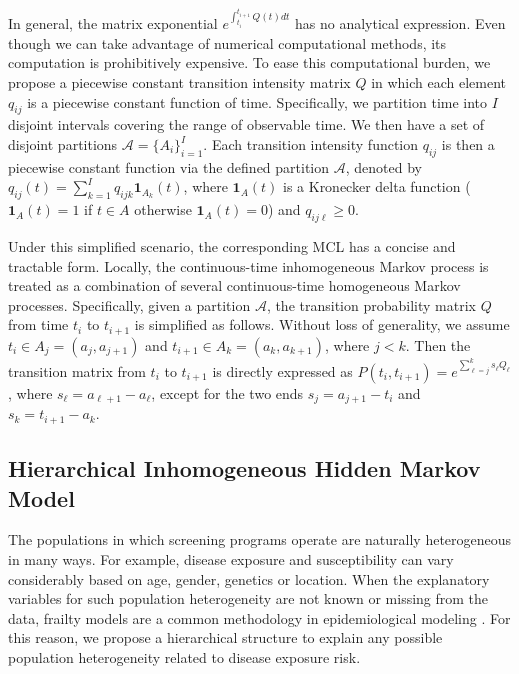 \documentclass{article}
\begin{document}
In general, the matrix exponential $e^{\int _{t_i}^{t_{i+1}}Q(t)dt}$ has no analytical expression. Even though we can take advantage of numerical computational methods, its computation is prohibitively expensive. To ease this computational burden, we propose a piecewise constant transition intensity matrix $Q$ in which each element $q_{ij}$ is a piecewise constant function of time. Specifically, we  partition time into $I$ disjoint intervals covering the range of observable time.  We then have a set of disjoint partitions $\mathcal{A} = \{ A_i\}_{i=1}^{I}$. Each transition intensity function $q_{ij}$ is then a piecewise constant function via the defined partition $\mathcal{A}$, denoted by $q_{ij}(t) = \sum_{k = 1}^{I}q_{ijk} \bm 1_{A_k}(t)$, where $\bm 1_{A}(t)$ is a Kronecker delta function ($\bm 1_{A}(t) = 1$ if $t \in A$ otherwise $\bm 1_{A}(t) = 0$) and $q_{ij\ell} \geq 0$. 

Under this simplified scenario, the corresponding MCL has a concise and tractable form. Locally, the continuous-time inhomogeneous Markov process is treated as a combination of several continuous-time homogeneous Markov processes. Specifically, given a partition $\mathcal{A}$, the transition probability matrix $Q$ from time $t_i$ to $t_{i+1}$ is simplified as follows. Without loss of generality, we assume $t_i \in A_{j} = (a_{j}, a_{j+1})$ and $t_{i+1} \in A_{k} = (a_{k}, a_{k+1})$, where $j<k$. Then the transition matrix from $t_i$ to $t_{i+1}$ is directly expressed as $P(t_i, t_{i+1}) = e^{\sum_{\ell = j}^{k} s_\ell Q_\ell }$, where $s_\ell = a_{\ell+1} - a_\ell$, except for the two ends $s_j = a_{j+1}- t_i$ and $s_k = t_{i+1} - a_k$.

\subsection{Hierarchical Inhomogeneous Hidden Markov Model}

The populations in which screening programs operate are naturally heterogeneous in many ways.  For example, disease exposure and susceptibility can vary considerably based on age, gender, genetics or location. 
When the explanatory variables for such population heterogeneity are not known or missing from the data, frailty models are a common methodology in epidemiological modeling \cite{Amy2010}. For this reason, we propose a hierarchical structure to explain any possible population heterogeneity related to disease exposure risk. 
\end{document}
